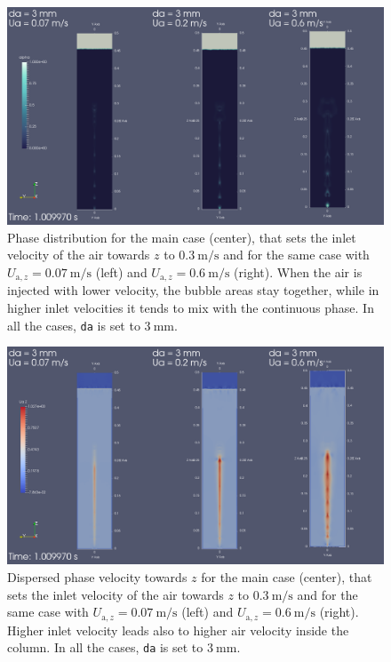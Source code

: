 \documentclass[11pt, a4paper, twoside]{article}
\begin{document}
\begin{figure}
    \centering
    \includegraphics[width=\textwidth]{figures/main/Ua_comparison}
    \caption{Phase distribution for the main case (center), that sets the inlet velocity of the air towards $z$ to $\SI{0.3}{\metre/\second}$ and for the same case with $U_{\mathrm{a},z}=\SI{0.07}{\metre/\second}$ (left) and $U_{\mathrm{a},z}=\SI{0.6}{\metre/\second}$ (right). When the air is injected with lower velocity, the bubble areas stay together, while in higher inlet velocities it tends to mix with the continuous phase. In all the cases, \texttt{da} is set to $\SI{3}{\milli\metre}$.}
    \label{fig:main_Ua_comparison}
\end{figure}

\begin{figure}
    \centering
    \includegraphics[width=\textwidth]{figures/main/Ua_comparison_Uaz}
    \caption{Dispersed phase velocity towards $z$ for the main case (center), that sets the inlet velocity of the air towards $z$ to $\SI{0.3}{\metre/\second}$ and for the same case with $U_{\mathrm{a},z}=\SI{0.07}{\metre/\second}$ (left) and $U_{\mathrm{a},z}=\SI{0.6}{\metre/\second}$ (right). Higher inlet velocity leads also to higher air velocity inside the column. In all the cases, \texttt{da} is set to $\SI{3}{\milli\metre}$.}
    \label{fig:main_Ua_comparison_Uaz}
\end{figure}
\end{document}
